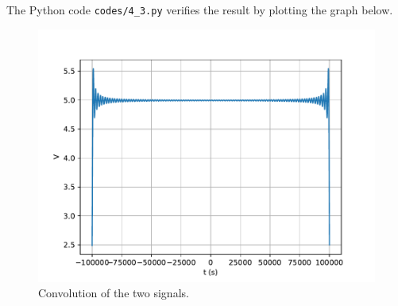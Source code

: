 \documentclass[journal,12pt,twocolumn]{IEEEtran}
\renewcommand\thesection{\arabic{section}}
\begin{document}
\begin{enumerate}[label=\thesection.\arabic*
,ref=\thesection.\theenumi]
\solution The Python code \texttt{codes/4\_3.py} verifies the result
by plotting the graph below.
\begin{figure}[!ht]
    \includegraphics[width=\columnwidth]{figs/4_3.pdf}
    \caption{Convolution of the two signals.}
    \label{eq:fig-conv}
\end{figure}
\end{enumerate}
\end{document}
